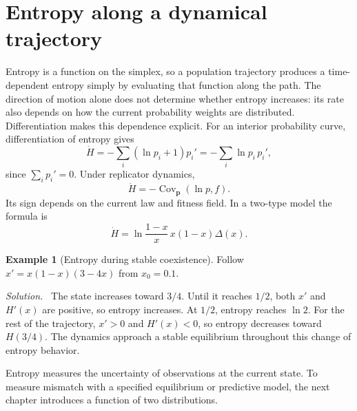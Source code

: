 \documentclass[11pt,oneside,openany]{book}
\theoremstyle{definition}
\newtheorem{example}{Example}[chapter]
\theoremstyle{remark}
\newenvironment{solution}{\par\smallskip\noindent\textit{Solution.}\ }{\par\smallskip}
\newcommand{\Cov}{\operatorname{Cov}}
\newcommand{\p}{\mathbf{p}}
\numberwithin{equation}{chapter}
\begin{document}
\section{Entropy along a dynamical trajectory}
Entropy is a function on the simplex, so a population trajectory produces a time-dependent entropy simply by evaluating that function along the path. The direction of motion alone does not determine whether entropy increases: its rate also depends on how the current probability weights are distributed. Differentiation makes this dependence explicit.
For an interior probability curve, differentiation of entropy gives
\[
\dot H=-\sum_i(\ln p_i+1)p_i'=-\sum_i\ln p_i\,p_i',
\]
since $\sum_i p_i'=0$. Under replicator dynamics,
\begin{equation}\label{eq:entropyrate}
\dot H=-\Cov_\p(\ln p,f).
\end{equation}
Its sign depends on the current law and fitness field. In a two-type model the formula is
\[
\dot H=\ln\frac{1-x}{x}\,x(1-x)\Delta(x).
\]

\begin{example}[Entropy during stable coexistence]
Follow $x'=x(1-x)(3-4x)$ from $x_0=0.1$.
\begin{solution}
The state increases toward $3/4$. Until it reaches $1/2$, both $x'$ and $H'(x)$ are positive, so entropy increases. At $1/2$, entropy reaches $\ln2$. For the rest of the trajectory, $x'>0$ and $H'(x)<0$, so entropy decreases toward $H(3/4)$. The dynamics approach a stable equilibrium throughout this change of entropy behavior.
\end{solution}
\end{example}

Entropy measures the uncertainty of observations at the current state. To measure mismatch with a specified equilibrium or predictive model, the next chapter introduces a function of two distributions.

\FloatBarrier
\end{document}
